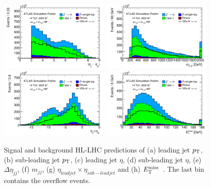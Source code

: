 \begin{figure}[tp]
  \includegraphics[width=0.48\textwidth]{figures/ATL-PHYS-PUB-2014-018/fig_03e}
  \includegraphics[width=0.48\textwidth]{figures/ATL-PHYS-PUB-2014-018/fig_03f}
  \includegraphics[width=0.48\textwidth]{figures/ATL-PHYS-PUB-2014-018/fig_03g}
  \includegraphics[width=0.48\textwidth]{figures/ATL-PHYS-PUB-2014-018/fig_03h}
  \caption{Signal and background HL-LHC predictions of (a) leading jet $p_{\mathrm{T}}$, (b) sub-leading jet $p_{\mathrm{T}}$, (c) leading jet $\eta$, (d) sub-leading jet $\eta$, (e) $\Delta\eta_{jj}$, (f) $m_{jj}$, (g) $\eta_{lead jet}\times \eta_{sub-lead jet}$ and (h) $E_{\mathrm{T}}^{\mathrm{miss}}$~\cite{ATL-PHYS-PUB-2014-018}. The last bin contains the overflow events.}
  \label{fig:prospects-hllhc-jets}
\end{figure}

